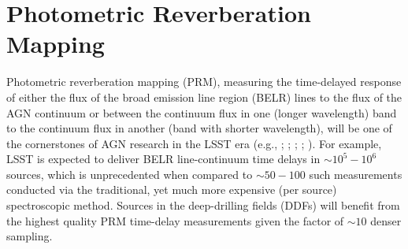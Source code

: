 %
%
%
%
%
%
%

\section{Photometric Reverberation Mapping}
\def\secname{AGNPhotoRM}\label{sec:\secname} %




Photometric reverberation mapping (PRM), measuring the time-delayed
response of either the flux of the broad emission line region (BELR)
lines to the flux of the AGN continuum or between the continuum flux
in one (longer wavelength) band to the continuum flux in another (band
with shorter wavelength), will be one of the cornerstones of AGN
research in the LSST era (e.g., \citet{Chelouche2013};
\citet{CheloucheandZucker2013}; \citet{CheloucheEtal2014};
\citet{EdelsonEtal2015}; \citet{FausnaughEtal2015}). For example, LSST
is expected to deliver BELR line-continuum time delays in
$\sim10^5-10^6$ sources, which is unprecedented when compared to
$\sim50-100$ such measurements conducted via the traditional, yet much
more expensive (per source) spectroscopic method. Sources in the
deep-drilling fields (DDFs) will benefit from the highest quality PRM
time-delay measurements given the factor of $\sim10$ denser sampling.

